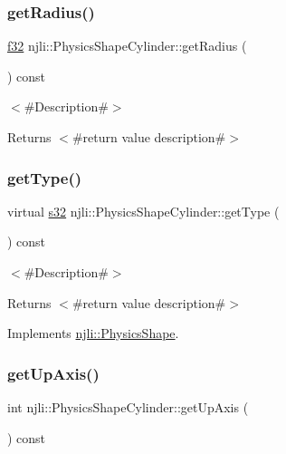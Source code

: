 \subsubsection{\texorpdfstring{get\+Radius()}{getRadius()}}
{\footnotesize\ttfamily \mbox{\hyperlink{_util_8h_a5f6906312a689f27d70e9d086649d3fd}{f32}} njli\+::\+Physics\+Shape\+Cylinder\+::get\+Radius (\begin{DoxyParamCaption}{ }\end{DoxyParamCaption}) const}

$<$\#\+Description\#$>$

\begin{DoxyReturn}{Returns}
$<$\#return value description\#$>$ 
\end{DoxyReturn}
\mbox{\label{classnjli_1_1_physics_shape_cylinder_a512461c5827b246cdd5e037b2dc38d7c}} 
\subsubsection{\texorpdfstring{get\+Type()}{getType()}}
{\footnotesize\ttfamily virtual \mbox{\hyperlink{_util_8h_aa62c75d314a0d1f37f79c4b73b2292e2}{s32}} njli\+::\+Physics\+Shape\+Cylinder\+::get\+Type (\begin{DoxyParamCaption}{ }\end{DoxyParamCaption}) const\hspace{0.3cm}{\ttfamily [virtual]}}

$<$\#\+Description\#$>$

\begin{DoxyReturn}{Returns}
$<$\#return value description\#$>$ 
\end{DoxyReturn}


Implements \mbox{\hyperlink{classnjli_1_1_physics_shape_ac7c6b2ac373892095f8220d56f8ad6de}{njli\+::\+Physics\+Shape}}.

\mbox{\label{classnjli_1_1_physics_shape_cylinder_a540d188e51168afbcc758b0ddeb74c9f}} 
\subsubsection{\texorpdfstring{get\+Up\+Axis()}{getUpAxis()}}
{\footnotesize\ttfamily int njli\+::\+Physics\+Shape\+Cylinder\+::get\+Up\+Axis (\begin{DoxyParamCaption}{ }\end{DoxyParamCaption}) const}

